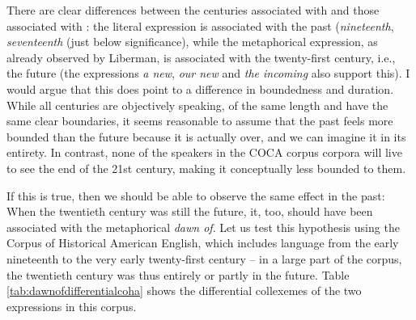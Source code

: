 There are clear differences between the centuries associated with  and those associated with : the literal expression is associated with the past (\textit{nineteenth}, \textit{seventeenth} (just below significance), while the metaphorical expression, as already observed by Liberman, is associated with the twenty-first century, i.e., the future (the expressions \textit{a new}, \textit{our new} and \textit{the incoming} also support this). I would argue that this does point to a difference in boundedness and duration. While all centuries are objectively speaking, of the same length and have the same clear boundaries, it seems reasonable to assume that the past feels more bounded than the future because it is actually over, and we can imagine it in its entirety. In contrast, none of the speakers in the COCA corpus corpora will live to see the end of the 21st century, making it conceptually less bounded to them.

If this is true, then we should be able to observe the same effect in the past: When the twentieth century was still the future, it, too, should have been associated with the metaphorical \textit{dawn of}. Let us test this hypothesis using the Corpus of Historical American English, which includes language from the early nineteenth to the very early twenty-first century -- in a large part of the corpus, the twentieth century was thus entirely or partly in the future. Table \ref{tab:dawnofdifferentialcoha} shows the differential collexemes of the two expressions in this corpus.

